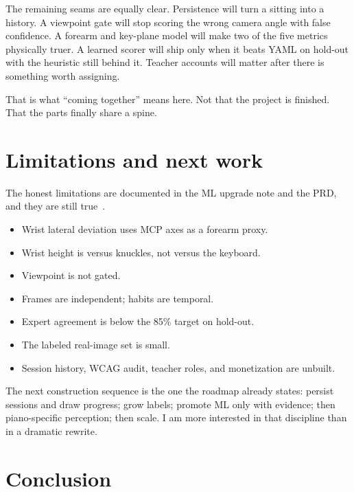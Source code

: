 \documentclass[11pt,a4paper]{article}
\begin{document}
The remaining seams are equally clear.
Persistence will turn a sitting into a history.
A viewpoint gate will stop scoring the wrong camera angle with false confidence.
A forearm and key-plane model will make two of the five metrics physically truer.
A learned scorer will ship only when it beats YAML on hold-out with the heuristic still behind it.
Teacher accounts will matter after there is something worth assigning.

That is what \enquote{coming together} means here.
Not that the project is finished.
That the parts finally share a spine.

\section{Limitations and next work}
\label{sec:next}

The honest limitations are documented in the ML upgrade note and the PRD, and they are still true~\cite{mlupgrade,prd}.

\begin{itemize}
  \item Wrist lateral deviation uses MCP axes as a forearm proxy.
  \item Wrist height is versus knuckles, not versus the keyboard.
  \item Viewpoint is not gated.
  \item Frames are independent; habits are temporal.
  \item Expert agreement is below the 85\% target on hold-out.
  \item The labeled real-image set is small.
  \item Session history, WCAG audit, teacher roles, and monetization are unbuilt.
\end{itemize}

The next construction sequence is the one the roadmap already states: persist sessions and draw progress; grow labels; promote ML only with evidence; then piano-specific perception; then scale.
I am more interested in that discipline than in a dramatic rewrite.

\section{Conclusion}
\end{document}
